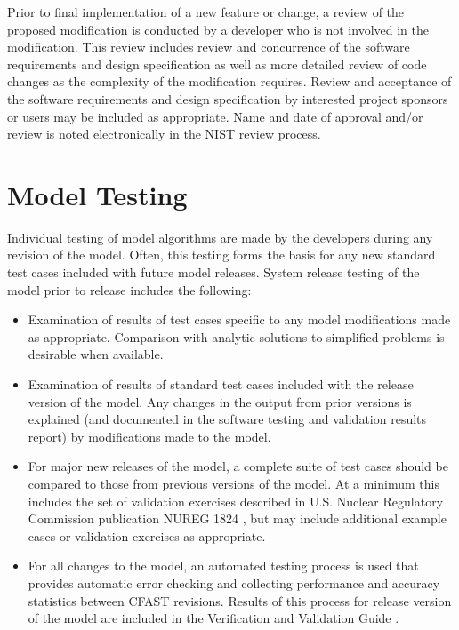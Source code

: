\documentclass[12pt]{book}
\begin{document}
Prior to final implementation of a new feature or change, a review of the proposed modification is conducted by a developer who is not involved in the modification.  This review includes review and concurrence of the software requirements and design specification as well as more detailed review of code changes as the complexity of the modification requires. Review and acceptance of the software requirements and design specification by interested project sponsors or users may be included as appropriate. Name and date of approval and/or review is noted electronically in the NIST review process.

\section{Model Testing}

Individual testing of model algorithms are made by the developers during any revision of the model. Often, this testing forms the basis for any new standard test cases included with future model releases. System release testing of the model prior to release includes the following:

\begin{itemize}
\item Examination of results of test cases specific to any model modifications made as appropriate.  Comparison with analytic solutions to simplified problems is desirable when available.

\item Examination of results of standard test cases included with the release version of the model. Any changes in the output from prior versions is explained (and documented in the software testing and validation results report) by modifications made to the model.

\item For major new releases of the model, a complete suite of test cases should be compared to those from previous versions of the model.  At a minimum this includes the set of validation exercises described in U.S. Nuclear Regulatory Commission publication NUREG 1824 \cite{NRCNUREG1824}, but may include additional example cases or validation exercises as appropriate.

\item For all changes to the model, an automated testing process is used that provides automatic error checking and collecting performance and accuracy statistics between CFAST revisions. Results of this process for release version of the model are included in the Verification and Validation Guide \cite{CFAST_Valid_Guide_7}.
\end{itemize}
\end{document}
